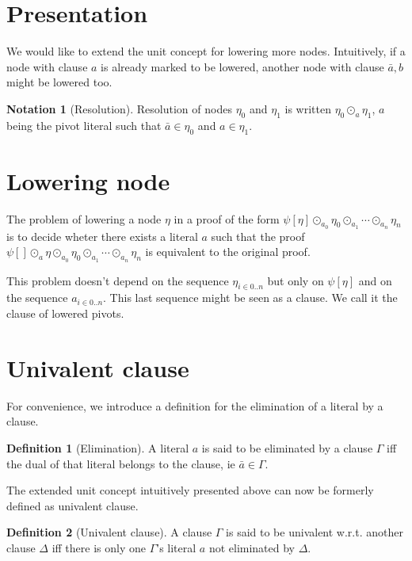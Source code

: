 \documentclass[a4paper]{article}
\theoremstyle{definition}
\newtheorem{defn}{Definition}
\newtheorem*{nota}{Notation}
\begin{document}
\section{Presentation}

We would like to extend the unit concept for lowering more nodes. Intuitively,
if a node with clause $a$ is already marked to be lowered, another node with
clause $\bar{a},b$ might be lowered too.

\begin{nota}[Resolution]
Resolution of nodes $\eta_0$ and $\eta_1$ is written $\eta_0 \odot_a
\eta_1$, $a$ being the pivot literal such that $\bar{a} \in \eta_0$ and $a
\in \eta_1$.
\end{nota}

\section{Lowering node}

The problem of lowering a node $\eta$ in a proof of the form $\psi[\eta]
\odot_{a_0} \eta_0 \odot_{a_1} \cdots \odot_{a_n} \eta_n$ is to decide
wheter there exists a literal $a$ such that the proof $\psi[] \odot_a \eta
\odot_{a_0} \eta_0 \odot_{a_1} \cdots \odot_{a_n} \eta_n$ is equivalent to
the original proof.

This problem doesn't depend on the sequence $\eta_{i \in 0..n}$ but only on
$\psi[\eta]$ and on the sequence $a_{i \in 0..n}$. This last sequence might
be seen as a clause. We call it the clause of lowered pivots.

\section{Univalent clause}

For convenience, we introduce a definition for the elimination of a literal by a
clause.

\begin{defn}[Elimination]
A literal $a$ is said to be eliminated by a clause $\Gamma$ iff the dual of that
literal belongs to the clause, ie $\bar{a} \in \Gamma$.
\end{defn}

The extended unit concept intuitively presented above can now be formerly
defined as univalent clause.

\begin{defn}[Univalent clause]
A clause $\Gamma$ is said to be univalent w.r.t. another clause $\Delta$ iff
there is only one $\Gamma$'s literal $a$ not eliminated by $\Delta$.
\end{defn}
\end{document}

